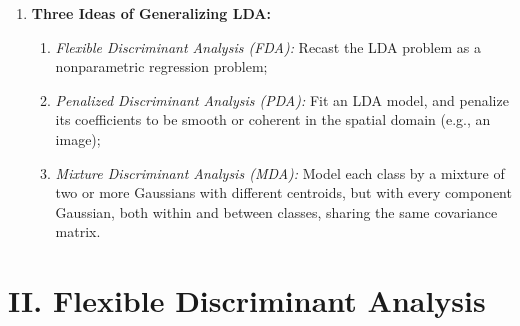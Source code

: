 \documentclass[12pt]{article}
\begin{document}
\begin{enumerate}[label=\textbf{\arabic*.}]
	\item \textbf{Three Ideas of Generalizing LDA:} 
	\begin{enumerate}
		\item \textit{Flexible Discriminant Analysis (FDA):} Recast the LDA problem as a nonparametric regression problem; 
		\item \textit{Penalized Discriminant Analysis (PDA):} Fit an LDA model, and penalize its coefficients to be smooth or coherent in the spatial domain (e.g., an image); 
		\item \textit{Mixture Discriminant Analysis (MDA):} Model each class by a mixture of two or more Gaussians with different centroids, but with every component Gaussian, both within and between classes, sharing the same covariance matrix. 
	\end{enumerate} 

\end{enumerate}


\section*{II. Flexible Discriminant Analysis}
\end{document}
